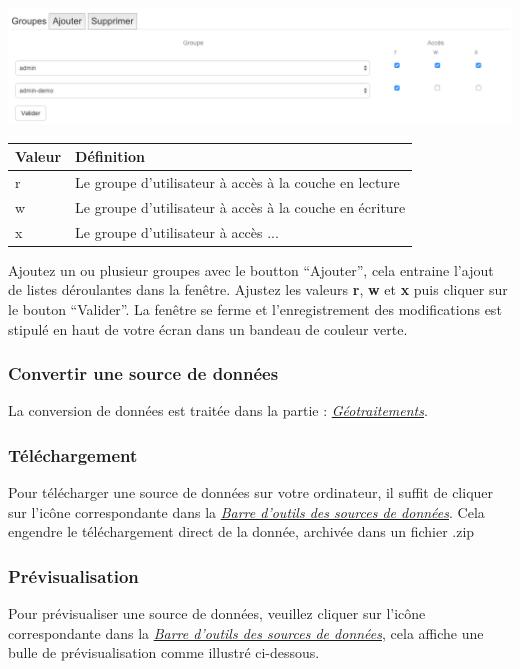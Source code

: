 \documentclass[letterpaper,10pt,french]{sphinxmanual}
\begin{document}
\includegraphics[width=1.000\linewidth]{data-privileges.png}

\begin{tabulary}{\linewidth}{|L|L|}
\hline

\textbf{Valeur}
 & 
\textbf{Définition}
\\
\hline
r
 & 
Le groupe d'utilisateur à accès à la couche en lecture
\\
\hline
w
 & 
Le groupe d'utilisateur à accès à la couche en écriture
\\
\hline
x
 & 
Le groupe d'utilisateur à accès ...
\\
\hline\end{tabulary}


Ajoutez un ou plusieur groupes avec le boutton ``Ajouter'', cela entraine l'ajout de listes déroulantes dans la fenêtre. Ajustez les valeurs \textbf{r}, \textbf{w} et \textbf{x} puis cliquer sur le bouton ``Valider''. La fenêtre se ferme et l'enregistrement des modifications est stipulé en haut de votre écran dans un bandeau de couleur verte.


\subsubsection{Convertir une source de données}
\label{data/datasources:convertir-une-source-de-donnees}
La conversion de données est traitée dans la partie : {\hyperref[data/processing:data-processing]{\emph{Géotraitements}}}.


\subsubsection{Téléchargement}
\label{data/datasources:telechargement}
Pour télécharger une source de données sur votre ordinateur, il suffit de cliquer sur l'icône correspondante dans la {\hyperref[data/datasources:datasource-table-label]{\emph{Barre d'outils des sources de données}}}. Cela engendre le téléchargement direct de la donnée, archivée dans un fichier .zip


\subsubsection{Prévisualisation}
\label{data/datasources:previsualisation}
Pour prévisualiser une source de données, veuillez cliquer sur l'icône
correspondante dans la {\hyperref[data/datasources:datasource-table-label]{\emph{Barre d'outils des sources de données}}}, cela affiche une
bulle de prévisualisation comme illustré ci-dessous.
\end{document}
